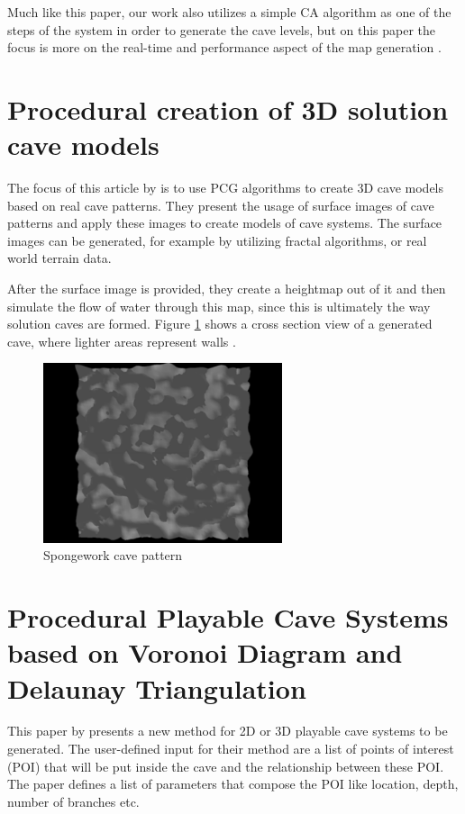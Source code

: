 Much like this paper, our work also utilizes a simple CA algorithm as one of the steps of the system in order to generate the cave levels, but on this paper the focus is more on the real-time and performance aspect of the map generation \cite{johnson:2010}.

\section{Procedural creation of 3D solution cave models}

The focus of this article by \citeauthor{boggus:2009} is to use PCG algorithms to create 3D cave models based on real cave patterns. They present the usage of surface images of cave patterns and apply these images to create models of cave systems. The surface images can be generated, for example by utilizing fractal algorithms, or real world terrain data.

After the surface image is provided, they create a heightmap out of it and then simulate the flow of water through this map, since this is ultimately the way solution caves are formed. Figure \ref{fig:3d_cave} shows a cross section view of a generated cave, where lighter areas represent walls \citeyear{boggus:2009}.
\begin{figure}[h]
    \caption{Spongework cave pattern}
    \centerline{\includegraphics[width=7cm]{images/related_work/3d_cave.png}}
    \label{fig:3d_cave}
\end{figure}

\section{Procedural Playable Cave Systems
based on Voronoi Diagram and Delaunay Triangulation}

This paper by \citeauthor{santamaria:2014} presents a new method for 2D or 3D playable cave systems to be generated. The user-defined input for their method are a list of points of interest (POI) that will be put inside the cave and the relationship between these POI. The paper defines a list of parameters that compose the POI like location, depth, number of branches etc.

